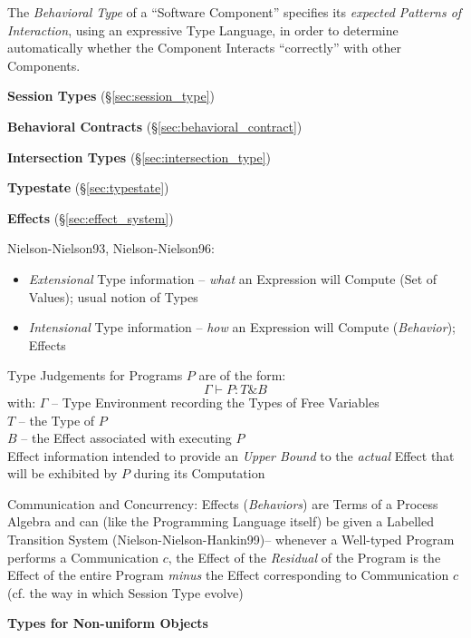 The \emph{Behavioral Type} of a ``Software Component'' specifies its
\emph{expected Patterns of Interaction}, using an expressive Type
Language, in order to determine automatically whether the Component
Interacts ``correctly'' with other Components.

\textbf{Session Types} (\S\ref{sec:session_type})

\textbf{Behavioral Contracts} (\S\ref{sec:behavioral_contract})

\textbf{Intersection Types} (\S\ref{sec:intersection_type})

\textbf{Typestate} (\S\ref{sec:typestate})

\textbf{Effects} (\S\ref{sec:effect_system})

Nielson-Nielson93, Nielson-Nielson96:

\begin{itemize}
  \item \emph{Extensional} Type information -- \emph{what} an
    Expression will Compute (Set of Values); usual notion of Types
  \item \emph{Intensional} Type information -- \emph{how} an
    Expression will Compute (\emph{Behavior}); Effects
\end{itemize}

Type Judgements for Programs $P$ are of the form:
\[
  \Gamma \vdash P : T\&B
\]
with:
$\Gamma$ -- Type Environment recording the Types of Free Variables \\
$T$ -- the Type of $P$ \\
$B$ -- the Effect associated with executing $P$ \\

Effect information intended to provide an \emph{Upper Bound} to the
\emph{actual} Effect that will be exhibited by $P$ during its
Computation

Communication and Concurrency: Effects (\emph{Behaviors}) are Terms of
a Process Algebra and can (like the Programming Language itself) be
given a Labelled Transition System (Nielson-Nielson-Hankin99)--
whenever a Well-typed Program performs a Communication $c$, the Effect
of the \emph{Residual} of the Program is the Effect of the entire
Program \emph{minus} the Effect corresponding to Communication $c$
(cf. the way in which Session Type evolve)


\textbf{Types for Non-uniform Objects}

